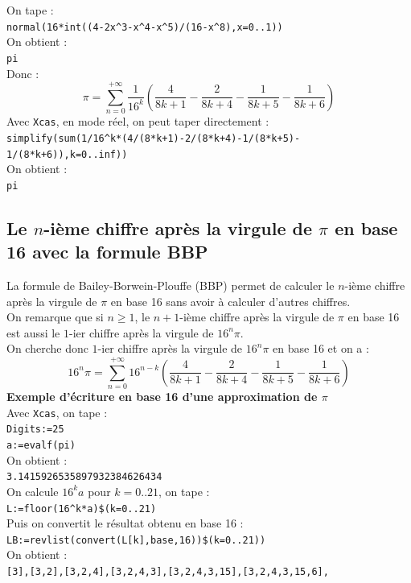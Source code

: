 \documentclass[a4paper,11pt]{book}
\begin{document}
\begin{enumerate}
On tape :\\
{\tt normal(16*int((4-2x\verb|^|3-x\verb|^|4-x\verb|^|5)/(16-x\verb|^|8),x=0..1))}\\
On obtient :\\
{\tt pi}\\
Donc :
$$\pi=\sum_{n=0}^{+\infty}\frac{1}{16^k}(\frac{4}{8k+1}-\frac{2}{8k+4}-\frac{1}{8k+5}-\frac{1}{8k+6})$$
Avec {\tt Xcas}, en mode r\'eel, on peut taper directement :\\
{\tt simplify(sum(1/16\verb|^|k*(4/(8*k+1)-2/(8*k+4)-1/(8*k+5)-\\ 1/(8*k+6)),k=0..inf))}\\
On obtient :\\
{\tt pi}
\end{enumerate}

\subsection{Le $n$-ième chiffre apr\`es la virgule de $\pi$ en base 16 avec la formule BBP}
La formule de Bailey-Borwein-Plouffe (BBP) permet
de calculer le $n$-ième chiffre apr\`es la virgule de $\pi$ en base 16 sans
avoir \`a calculer d'autres chiffres.\\
On remarque que si $n\geq 1$, le $n+1$-ième chiffre apr\`es la virgule de $\pi$
en base 16 est aussi le $1$-ier chiffre apr\`es la virgule de $16^n\pi$.\\
On cherche donc $1$-ier chiffre apr\`es la virgule de $16^n\pi$ en base 16 et
on a :\\
$$16^n\pi=\sum_{n=0}^{+\infty}16^{n-k}(\frac{4}{8k+1}-\frac{2}{8k+4}-\frac{1}{8k+5}-\frac{1}{8k+6})$$
{\bf Exemple d'\'ecriture en base 16 d'une approximation de $\pi$}\\
Avec {\tt Xcas}, on tape :\\
{\tt Digits:=25}\\
{\tt a:=evalf(pi)}\\
On obtient :\\
{\tt 3.1415926535897932384626434}\\
On calcule $16^ka$ pour $k=0..21$, on tape :\\
{\tt L:=floor(16\verb|^|k*a)\$(k=0..21)}\\
Puis on convertit le r\'esultat obtenu en base 16 :\\
{\tt LB:=revlist(convert(L[k],base,16))\$(k=0..21))}\\
On obtient :\\
{\tt [3],[3,2],[3,2,4],[3,2,4,3],[3,2,4,3,15],[3,2,4,3,15,6],}\\
\end{document}

